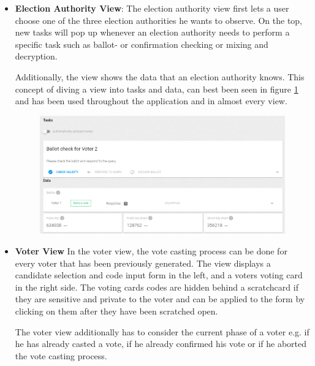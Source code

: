 \begin{itemize}
	\item \textbf{Election Authority View}: The election authority view first lets a user choose one of the three election authorities he wants to observe. On the top, new tasks will pop up whenever an election authority needs to perform a specific task such as ballot- or confirmation checking or mixing and decryption.

Additionally, the view shows the data that an election authority knows. This concept of diving a view into tasks and data, can best been seen in figure \ref{Election Authority View} and has been used throughout the application and in almost every view.

\begin{figure}[p]
\begin{center}
\includegraphics[scale=0.43]{assets/screenshots/view.png}
\label{Election Authority View}%
\end{center}
\end{figure}

	\item \textbf{Voter View}
	In the voter view, the vote casting process can be done for every voter that has been previously generated. The view displays a candidate selection and code input form in the left, and a voters voting card in the right side. The voting cards codes are hidden behind a scratchcard if they are sensitive and private to the voter and can be applied to the form by clicking on them after they have been scratched open.

The voter view additionally has to consider the current phase of a voter e.g. if he has already casted a vote, if he already confirmed his vote or if he aborted the vote casting process.


\end{itemize}
